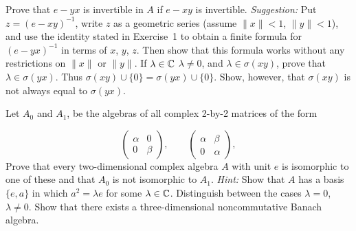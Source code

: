 \begin{enumerate}
\begin{excopy}
\begin{itemize}
Prove that \(e - yx\) is invertible in $A$
if \(e - xy\) is invertible. \emph{Suggestion:} Put
\(z =(e-xy)^{-1}\), write $z$ as a geometric series
(assume \(\|x\| < 1\), \(\|y\| < 1\)), and
use the identity stated in Exercise~1
to obtain a finite formula for \((e - yx)^{-1}\)
in terms of $x$, $y$, $z$. Then show that this formula works without any
restrictions on \(\|x\|\) or \(\|y\|\).
If \(\lambda \in \mathbb{C}\) \(\lambda \neq 0\),
  and \(\lambda \in \sigma(xy)\), prove that \(\lambda \in \sigma(yx)\).
  Thus \(\sigma(xy) \cup \{0\} = \sigma(yx) \cup \{0\}\).
  Show, however, that \(\sigma(xy)\) is not always equal to \(\sigma(yx)\).
\end{itemize}
\end{excopy}

\unfinished

\begin{excopy}
Let \(A_0\) and \(A_1\),
be the algebras of all complex 2-by-2 matrices of the form

\begin{equation*}
\left(
  \begin{array}{ll}
   \alpha & 0 \\
   0 & \beta
  \end{array}
\right),
\qquad
\left(
  \begin{array}{ll}
   \alpha & \beta \\
   0 & \alpha
  \end{array}
\right),
\end{equation*}
Prove that every two-dimensional complex algebra $A$ with unit $e$ is isomorphic
to one of these
  and that \(A_0\) is not isomorphic to \(A_1\).
    \emph{Hint:} Show that $A$ has a
basis \(\{e, a\}\) in which \(a^2 = \lambda e\) for some \(\lambda \in \mathbb{C}\).
  Distinguish between the cases
  \(\lambda=0\), \(\lambda \neq 0\).
  Show that there exists a three-dimensional noncommutative
Banach algebra.
\end{excopy}

\unfinished

\begin{excopy}
\end{excopy}

\unfinished

\end{enumerate}
